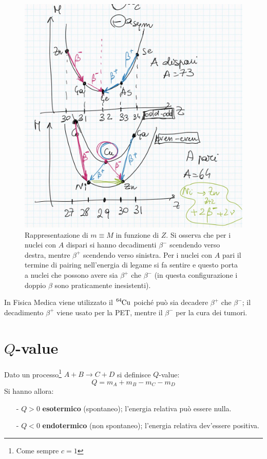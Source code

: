 \begin{figure}[!h]
    \centering
    \includegraphics[scale=0.3]{Immagini/MvsZ.png}
    \caption{Rappresentazione di $m\equiv M$ in funzione di $Z$. Si osserva che per i nuclei con $A$ dispari si hanno decadimenti $\beta^-$ scendendo verso destra, mentre $\beta^+$ scendendo verso sinistra. Per i nuclei con $A$ pari il termine di pairing nell'energia di legame si fa sentire e questo porta a nuclei che possono avere sia $\beta^+$ che $\beta^-$ (in questa configurazione i doppio $\beta$ sono praticamente inesistenti).}
    \label{MvsZ}
\end{figure}

\begin{curiosita}
In Fisica Medica viene utilizzato il $\ce{^64Cu}$ poiché può sia decadere $\beta^+$ che $\beta^-$; il decadimento $\beta^+$ viene usato per la PET, mentre il $\beta^-$ per la cura dei tumori.
\end{curiosita}

\section{$Q$-value}
Dato un processo\footnote{Come sempre $c=1$} $A+B\to C+D$ si definisce $Q$-value:
$$Q = m_A + m_B - m_C - m_D$$
Si hanno allora:
\begin{itemize}
    \item[-] $Q>0$ \textbf{esotermico} (spontaneo); l'energia relativa può essere nulla. 
    \item[-] $Q<0$ \textbf{endotermico} (non spontaneo); l'energia relativa dev'essere positiva.
\end{itemize}
\newpage

